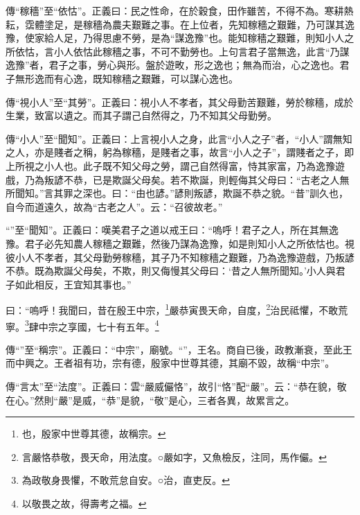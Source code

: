 {\noindent\zhuan{}\fzbyks 傳“稼穡”至“依怙”。正義曰：民之性命，在於穀食，田作雖苦，不得不為。寒耕熱耘，霑體塗足，是稼穡為農夫艱難之事。在上位者，先知稼穡之艱難，乃可謀其逸豫，使家給人足，乃得思慮不勞，是為“謀逸豫”也。能知稼穡之艱難，則知小人之所依怙，言小人依怙此稼穡之事，不可不勤勞也。上句言君子當無逸，此言“乃謀逸豫”者，君子之事，勞心與形。盤於遊畋，形之逸也；無為而治，心之逸也。君子無形逸而有心逸，既知稼穡之艱難，可以謀心逸也。 \par}

{\noindent\zhuan{}\fzbyks 傳“視小人”至“其勞”。正義曰：視小人不孝者，其父母勤苦艱難，勞於稼穡，成於生業，致富以遺之。而其子謂己自然得之，乃不知其父母勤勞。 \par}

{\noindent\zhuan{}\fzbyks 傳“小人”至“聞知”。正義曰：上言視小人之身，此言“小人之子”者，“小人”謂無知之人，亦是賤者之稱，躬為稼穡，是賤者之事，故言“小人之子”，謂賤者之子，即上所視之小人也。此子既不知父母之勞，謂己自然得富，恃其家富，乃為逸豫遊戲，乃為叛諺不恭，已是欺誕父母矣。若不欺誕，則輕侮其父母曰：“古老之人無所聞知。”言其罪之深也。曰：“由也諺。”諺則叛諺，欺誕不恭之貌。“昔”訓久也，自今而道遠久，故為“古老之人”。云：“召彼故老。” \par}

{\noindent\shu{}\fzkt “”至“聞知”。正義曰：嘆美君子之道以戒王曰：“嗚呼！君子之人，所在其無逸豫。君子必先知農人稼穡之艱難，然後乃謀為逸豫，如是則知小人之所依怙也。視彼小人不孝者，其父母勤勞稼穡，其子乃不知稼穡之艱難，乃為逸豫遊戲，乃叛諺不恭。既為欺誕父母矣，不欺，則又侮慢其父母曰：‘昔之人無所聞知。’小人與君子如此相反，王宜知其事也。” \par}

曰：“嗚呼！我聞曰，昔在殷王中宗，\footnote{也，殷家中世尊其德，故稱宗。}嚴恭寅畏天命，自度，\footnote{言嚴恪恭敬，畏天命，用法度。○嚴如字，又魚檢反，注同，馬作儼。}治民祗懼，不敢荒寧。\footnote{為政敬身畏懼，不敢荒怠自安。○治，直吏反。}肆中宗之享國，七十有五年。\footnote{以敬畏之故，得壽考之福。}


{\noindent\zhuan{}\fzbyks 傳“”至“稱宗”。正義曰：“中宗”，廟號。“”，王名。商自已後，政教漸衰，至此王而中興之。王者祖有功，宗有德，殷家中世尊其德，其廟不毀，故稱“中宗”。 \par}

{\noindent\zhuan{}\fzbyks 傳“言太”至“法度”。正義曰：雲“嚴威儼恪”，故引“恪”配“嚴”。云：“恭在貌，敬在心。”然則“嚴”是威，“恭”是貌，“敬”是心，三者各異，故累言之。 \par}

